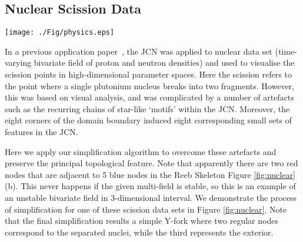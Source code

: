 \documentclass[twocolumn]{article}
\newcommand{\figref}[1]{Figure \ref{fig:#1}}
\begin{document}
\subsection*{Nuclear Scission Data}
\begin{figure*}
	\centering
	 \texttt{[image: ./Fig/physics.eps]}  \\
	\caption{ This figure shows the simplification process of the
          JCN corresponding to a ``nuclear scission'' data set used in \cite{2012-Duke-VisWeek}. 
	The process includes: (a) The original JCN graph; (b) The Reeb
        Skeleton; (c) A modified representation of the Reeb Skeleton
        by changing the colour of the degree 2 singular nodes as
        ``blue'', since they capture  only minor topological information, (d)
        Simplified Reeb Skeleton after applying lip-pruning using
        the range measure for ordering the nodes (e) Resultant Reeb
        Skeleton is represented  as the ``Y''-fork; 
	(f) Geometry corresponding to the ``scission'' point.   }
	\label{fig:nuclear}
\end{figure*}
In a previous application paper~\cite{2012-Duke-VisWeek}, the JCN was
applied to nuclear data set (time-varying bivariate field of proton and neutron densities) and used to visualise the scission points in
high-dimensional parameter spaces. Here the scission refers to the
point where a single plutonium nucleus breaks into two fragments.
However, this was based on visual analysis, and was complicated by a 
number of artefacts such as the recurring chains of star-like ‘motifs’ within 
the JCN. Moreover, the eight corners of the domain boundary induced 
eight corresponding small sets of features in the JCN. 

Here we apply our simplification algorithm to
overcome these artefacts and preserve the principal topological
feature. Note that apparently there are two red nodes that are adjacent to
5 blue nodes in the Reeb Skeleton \figref{nuclear}(b). This never
happens if the given multi-field is stable, so this is an example of
an unstable bivariate field in 3-dimensional interval. We demonstrate the process of simplification for one of these 
scission data sets in \figref{nuclear}. Note that the final simplification
results a simple Y-fork where two regular nodes correspond to the separated
nuclei, while the third represents the exterior.
%
 
\end{document}
